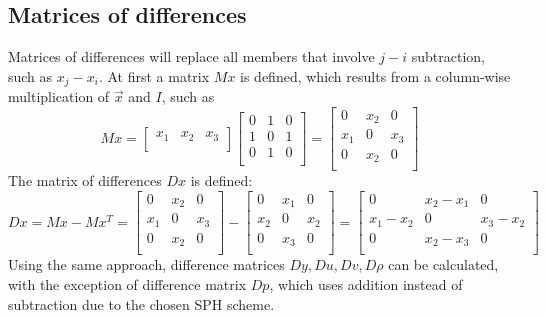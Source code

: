 \documentclass{article}
\begin{document}
\subsection{Matrices of differences} \label{matrices of differences}
Matrices of differences will replace all members that involve $j-i$ subtraction, such as $x_j-x_i$.
At first a matrix $Mx$ is defined, which results from a column-wise multiplication of $\Vec{x}$ and $I$, such as
$$
Mx=
\begin{bmatrix}
x_1 & x_2 & x_3\\
\end{bmatrix}
\begin{bmatrix}
0 & 1 & 0\\
1 & 0 & 1\\
0 & 1 & 0\\
\end{bmatrix}
=
\begin{bmatrix}
0 & x_2 & 0\\
x_1 & 0 & x_3\\
0 & x_2 & 0\\
\end{bmatrix}
$$
The matrix of differences $Dx$ is defined:
$$
Dx=Mx-Mx^T=
\begin{bmatrix}
0 & x_2 & 0\\
x_1 & 0 & x_3\\
0 & x_2 & 0\\
\end{bmatrix}
-
\begin{bmatrix}
0 & x_1 & 0\\
x_2 & 0 & x_2\\
0 & x_3 & 0\\
\end{bmatrix}
=
\begin{bmatrix}
0 & x_2-x_1 & 0\\
x_1-x_2 & 0 & x_3-x_2\\
0 & x_2-x_3 & 0\\
\end{bmatrix}
$$
Using the same approach, difference matrices $Dy, Du, Dv, D\rho$ can be calculated, with the exception of difference matrix $Dp$, which uses addition instead of subtraction due to the chosen SPH scheme.
\end{document}
